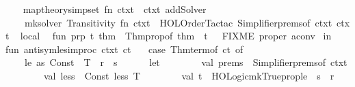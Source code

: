 \begin{isabellebody}
\endisadelimML
\isanewline
{}\isamarkupfalse%
\isanewline
%
\isadelimML
\isanewline
%
\endisadelimML
%
\isatagML
{}\isamarkupfalse%
\ {\isacartoucheopen}\isanewline
\ \ map{\isacharunderscore}{\kern0pt}theory{\isacharunderscore}{\kern0pt}simpset\ {\isacharparenleft}{\kern0pt}fn\ ctxt{}\ {\isacharequal}{\kern0pt}{\isachargreater}{\kern0pt}\ ctxt{}\ addSolver\isanewline
\ \ \ \ mk{\isacharunderscore}{\kern0pt}solver\ {\isachardoublequote}{\kern0pt}Transitivity{\isachardoublequote}{\kern0pt}\ {\isacharparenleft}{\kern0pt}fn\ ctxt\ {\isacharequal}{\kern0pt}{\isachargreater}{\kern0pt}\ HOL{\isacharunderscore}{\kern0pt}Order{\isacharunderscore}{\kern0pt}Tac{\isachardot}{\kern0pt}tac\ {\isacharparenleft}{\kern0pt}Simplifier{\isachardot}{\kern0pt}prems{\isacharunderscore}{\kern0pt}of\ ctxt{\isacharparenright}{\kern0pt}\ ctxt{\isacharparenright}{\kern0pt}{\isacharparenright}{\kern0pt}\isanewline
{\isacartoucheclose}\isanewline
\isanewline
{}\isamarkupfalse%
\ {\isacartoucheopen}\isanewline
local\isanewline
\ \ fun\ prp\ t\ thm\ {\isacharequal}{\kern0pt}\ Thm{\isachardot}{\kern0pt}prop{\isacharunderscore}{\kern0pt}of\ thm\ {\isacharequal}{\kern0pt}\ t{\isacharsemicolon}{\kern0pt}\ \ {\isacharparenleft}{\kern0pt}{\isacharasterisk}{\kern0pt}\ FIXME\ proper\ aconv{\isacharbang}{\kern0pt}{\isacharquery}{\kern0pt}\ {\isacharasterisk}{\kern0pt}{\isacharparenright}{\kern0pt}\isanewline
in\isanewline
\isanewline
fun\ antisym{\isacharunderscore}{\kern0pt}le{\isacharunderscore}{\kern0pt}simproc\ ctxt\ ct\ {\isacharequal}{\kern0pt}\isanewline
\ \ {\isacharparenleft}{\kern0pt}case\ Thm{\isachardot}{\kern0pt}term{\isacharunderscore}{\kern0pt}of\ ct\ of\isanewline
\ \ \ \ {\isacharparenleft}{\kern0pt}le\ as\ Const\ {\isacharparenleft}{\kern0pt}{\isacharunderscore}{\kern0pt}{\isacharcomma}{\kern0pt}\ T{\isacharparenright}{\kern0pt}{\isacharparenright}{\kern0pt}\ {\isachardollar}{\kern0pt}\ r\ {\isachardollar}{\kern0pt}\ s\ {\isacharequal}{\kern0pt}{\isachargreater}{\kern0pt}\isanewline
\ \ \ \ \ {\isacharparenleft}{\kern0pt}let\isanewline
\ \ \ \ \ \ \ \ val\ prems\ {\isacharequal}{\kern0pt}\ Simplifier{\isachardot}{\kern0pt}prems{\isacharunderscore}{\kern0pt}of\ ctxt{\isacharsemicolon}{\kern0pt}\isanewline
\ \ \ \ \ \ \ \ val\ less\ {\isacharequal}{\kern0pt}\ Const\ {\isacharparenleft}{\kern0pt}\isactrlconstUNDERSCOREname {\isasymopen}less{\isasymclose}{\isacharcomma}{\kern0pt}\ T{\isacharparenright}{\kern0pt}{\isacharsemicolon}{\kern0pt}\isanewline
\ \ \ \ \ \ \ \ val\ t\ {\isacharequal}{\kern0pt}\ HOLogic{\isachardot}{\kern0pt}mk{\isacharunderscore}{\kern0pt}Trueprop{\isacharparenleft}{\kern0pt}le\ {\isachardollar}{\kern0pt}\ s\ {\isachardollar}{\kern0pt}\ r{\isacharparenright}{\kern0pt}{\isacharsemicolon}{\kern0pt}\isanewline

\end{isabellebody}
